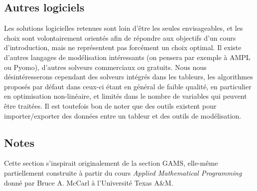 \subsection{Autres logiciels}

Les solutions logicielles retenues sont loin d'être les seules envisageables, et les choix sont volontairement orientés afin de répondre aux objectifs d'un cours d'introduction, mais ne représentent pas forcément un choix optimal.
Il existe d'autres langages de modélisation intéressants (on pensera par exemple à AMPL ou Pyomo), d'autres solveurs commerciaux ou gratuits.
Nous nous désintéresserons cependant des solveurs intégrés dans les tableurs, les algorithmes proposés par défaut dans ceux-ci étant en général de faible qualité, en particulier en optimisation non-linéaire, et limités dans le nombre de variables qui peuvent être traitées.
Il est toutefois bon de noter que des outils existent pour importer/exporter des données entre un tableur et des outils de modélisation.

\begin{small}
\section{Notes}

Cette section s'inspirait originalement de la section GAMS, elle-même partiellement construite à partir du cours {\sl Applied Mathematical Programming} donné par Bruce A. McCarl à l'Université Texas A\&M.

\end{small}